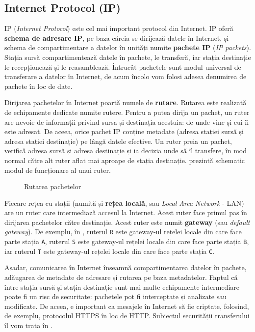 \subsection{Internet Protocol (IP)}
\label{sec:net:internet:ip}

IP  (\textit{Internet Protocol}) este cel mai important protocol din Internet. IP oferă \textbf{schema de adresare IP}, pe baza căreia se dirijează datele în Internet, și schema de compartimentare a datelor în unități numite \textbf{pachete IP} (\textit{IP packets}).
Stația sursă compartimentează datele în pachete, le transferă, iar stația destinație le recepționează și le reasamblează.
Întrucât pachetele sunt modul universal de transferare a datelor în Internet, de acum încolo vom folosi adesea denumirea de pachete în loc de date.

Dirijarea pachetelor în Internet poartă numele de \textbf{rutare}. Rutarea este realizată de echipamente dedicate numite rutere.
Pentru a putea dirija un pachet, un ruter are nevoie de informații privind sursa și destinația acestuia: de unde vine și cui îi este adresat.
De aceea, orice pachet IP conține metadate (adresa stației sursă și adresa stației destinație) pe lângă datele efective.
Un ruter preia un pachet, verifică adresa sursă și adresa destinație și ia decizia unde să îl transfere, în mod normal către alt ruter aflat mai aproape de stația destinație.
 prezintă schematic modul de funcționare al unui ruter.

\begin{figure}[htbp]
  \centering
  \def\svgwidth{\columnwidth}
  
  \caption{Rutarea pachetelor}
  \label{fig:net:routing}
\end{figure}

Fiecare rețea cu stații (numită și \textbf{rețea locală}, sau \textit{Local Area Network} - LAN) are un ruter care intermediază accesul la Internet.
Acest ruter face primul pas în dirijarea pachetelor către destinație.
Acest ruter este numit \textbf{gateway} (sau \textit{default gateway}).
De exemplu, în , ruterul \texttt{R} este gateway-ul rețelei locale din care face parte stația \texttt{A}, ruterul \texttt{S} este gateway-ul rețelei locale din care face parte stația \texttt{B}, iar ruterul \texttt{T} este gateway-ul rețelei locale din care face parte stația \texttt{C}.

Așadar, comunicarea în Internet înseamnă compartimentarea datelor în pachete, adăugarea de metadate de adresare și rutarea pe baza metadatelor.
Faptul că între stația sursă și stația destinație sunt mai multe echipamente intermediare poate fi un risc de securitate: pachetele pot fi interceptate și analizate sau modificate.
De aceea, e important ca mesajele în Internet să fie criptate, folosind, de exemplu, protocolul HTTPS în loc de HTTP.
Subiectul securității transferului îl vom trata în .

